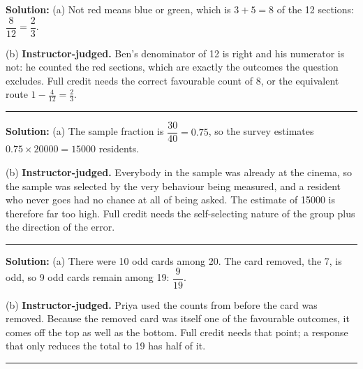 \documentclass[12pt]{article}
\begin{document}

\textbf{Solution:} (a) Not red means blue or green, which is $3 + 5 = 8$ of the
12 sections: $\dfrac{8}{12} = \dfrac{2}{3}$. 

(b) \textbf{Instructor-judged.} Ben's denominator of 12 is right and his
numerator is not: he counted the red sections, which are exactly the outcomes
the question excludes. Full credit needs the correct favourable count of 8, or
the equivalent route $1 - \frac{4}{12} = \frac{2}{3}$.

\vspace{0.25cm}\noindent\rule{\linewidth}{0.2pt}\vspace{0.25cm}


\textbf{Solution:} (a) The sample fraction is $\dfrac{30}{40} = 0.75$, so the
survey estimates $0.75 \times 20000 = 15000$ residents. 

(b) \textbf{Instructor-judged.} Everybody in the sample was already at the
cinema, so the sample was selected by the very behaviour being measured, and a
resident who never goes had no chance at all of being asked. The estimate of
15000 is therefore far too high. Full credit needs the self-selecting nature of
the group plus the direction of the error.

\vspace{0.25cm}\noindent\rule{\linewidth}{0.2pt}\vspace{0.25cm}


\textbf{Solution:} (a) There were 10 odd cards among 20. The card removed, the
7, is odd, so 9 odd cards remain among 19:
$\dfrac{9}{19}$. 

(b) \textbf{Instructor-judged.} Priya used the counts from before the card was
removed. Because the removed card was itself one of the favourable outcomes, it
comes off the top as well as the bottom. Full credit needs that point; a
response that only reduces the total to 19 has half of it.

\vspace{0.25cm}\noindent\rule{\linewidth}{0.2pt}\vspace{0.25cm}

\end{document}
